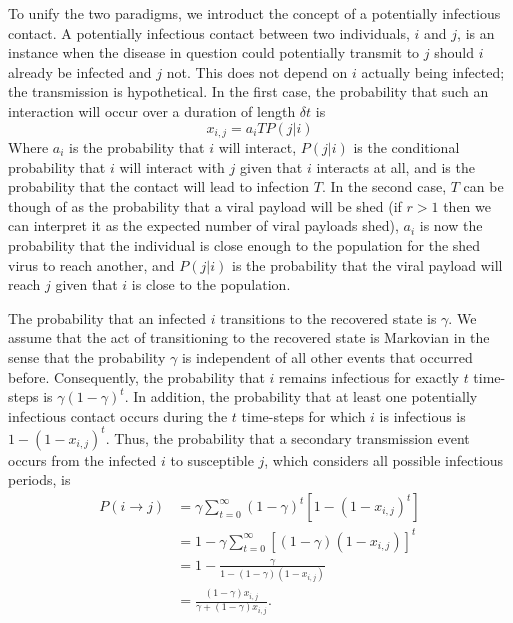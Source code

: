 \documentclass[10pt]{article}
\begin{document}
\begin{multicols}{2}
To unify the two paradigms, we introduct the concept of a potentially infectious contact. A potentially infectious contact between two individuals, $i$ and $j$, is an instance when the disease in question could potentially transmit to $j$ should $i$ already be infected and $j$ not. This does not depend on $i$ actually being infected; the transmission is hypothetical. In the first case, the probability that such an interaction will occur over a duration of length $\delta t$ is 
\begin{equation}
x_{i,j}=a_{i}TP(j|i)
\end{equation}
Where $a_{i}$ is the probability that $i$ will interact, $P(j|i)$ is the conditional probability that $i$ will interact with $j$ given that $i$ interacts at all, and is the probability that the contact will lead to infection $T$. In the second case, $T$ can be though of as the probability that a viral payload will be shed (if $r>1$ then we can interpret it as the expected number of viral payloads shed), $a_{i}$ is now the probability that the individual is close enough to the population for the shed virus to reach another, and $P(j|i)$ is the probability that the viral payload will reach $j$ given that $i$ is close to the population. 

The probability that an infected $i$ transitions to the recovered state is $\gamma$. We assume that the act of transitioning to the recovered state is Markovian in the sense that the probability $\gamma$ is independent of all other events that occurred before. Consequently, the probability that $i$ remains infectious for exactly $t$ time-steps is $\gamma(1-\gamma)^{t}$. In addition, the probability that at least one potentially infectious contact occurs during the $t$ time-steps for which $i$ is infectious is $1-(1-x_{i,j})^{t}$. Thus, the probability that a secondary transmission event occurs from the infected $i$ to susceptible $j$, which considers all possible infectious periods, is 
\begin{equation}
\label{i_to_j}
\begin{split}
P(i\rightarrow j)&=\gamma\sum_{t=0}^{\infty}(1-\gamma)^{t}[1-(1-x_{i,j})^{t}]\\
&=1-\gamma\sum_{t=0}^{\infty}[(1-\gamma)(1-x_{i,j})]^{t}\\
&=1-\frac{\gamma}{1-(1-\gamma)(1-x_{i,j})}\\
&=\frac{(1-\gamma)x_{i,j}}{\gamma+(1-\gamma)x_{i,j}}.
\end{split}
\end{equation}

\end{multicols}
\end{document}
